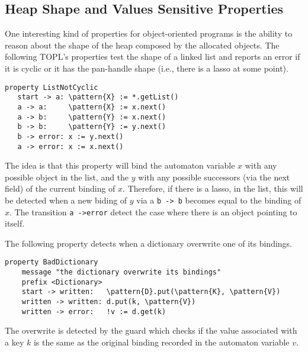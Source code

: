 \documentclass{llncs} %
\newcommand{\noterg}[2]{\textcolor{gray}{[\textcolor{red}{#1}: #2]}}
\newcommand{\dd}[1]{\noterg{dd}{#1}}
\newcommand{\dinocomment}[1]{\dd{#1}}
\newcommand{\delimitVerbatim}{\par\nobreak\smallskip\noindent}
\newcommand{\pattern}[1]{\ensuremath{\mathtt{\underline{#1}}}}
\begin{document}


\subsection{Heap Shape and Values Sensitive Properties}
One interesting kind of properties for object-oriented programs is the ability to reason about the shape of 
the heap composed by the allocated objects. 
The following TOPL's properties test the shape of a linked list and reports an error if it is cyclic or it has the pan-handle shape (i.e., there is a lasso at some point). 
%
\delimitVerbatim
\begin{Verbatim}[commandchars=\\\{\}]
property ListNotCyclic
   start -> a: \pattern{X} := *.getList()
   a -> a:     \pattern{X} := x.next()
   a -> b:     \pattern{Y} := x.next()
   b -> b:     \pattern{Y} := y.next()
   b -> error: x := y.next()
   a -> error: x := x.next()
\end{Verbatim}
\delimitVerbatim
The idea is that this property will bind the automaton variable $x$
with any possible object in the list, and the $y$ with any possible successors (via the next field) 
of the current binding of $x$. Therefore, if there is a lasso, in the list, this will be detected when a new 
biding of $y$ via a \texttt{b -> b} becomes equal to the binding of $x$. The transition \texttt{a ->error} detect
the case where there is an object pointing to itself. 
%

The following property detects when a dictionary overwrite one of its bindings. 
\delimitVerbatim
\begin{Verbatim}[commandchars=\\\{\}]
 property BadDictionary
    message "the dictionary overwrite its bindings"
    prefix <Dictionary>
    start -> written:   \pattern{D}.put(\pattern{K}, \pattern{V})
    written -> written: d.put(k, \pattern{V})
    written -> error:   !v := d.get(k)
\end{Verbatim}
\delimitVerbatim
The overwrite is detected by the guard which checks if the value associated with a key $k$ is
the same as the original binding recorded in the automaton variable $v$.
\end{document}
